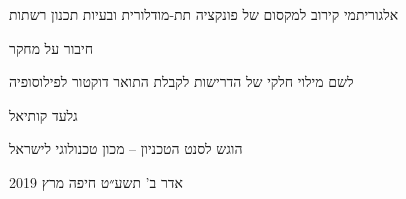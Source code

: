 \begin{hebrew}
\begin{center}

{\Huge אלגוריתמי קירוב למקסום של פונקציה תת-מודלורית ובעיות תכנון רשתות}


{\Large חיבור על מחקר}


\parbox{30em}{
\begin{center}
לשם מילוי חלקי של הדרישות לקבלת התואר
דוקטור לפילוסופיה
\end{center}
}


{\huge גלעד קותיאל}


הוגש לסנט הטכניון – מכון טכנולוגי לישראל

\parbox{16em}{
\begin{center}
אדר ב' תשע״ט \hfill חיפה \hfill מרץ 2019
\end{center}
}
\end{center}
\end{hebrew}
